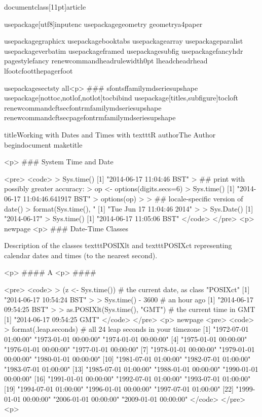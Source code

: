 documentclass[11pt]{article} %

usepackage[utf8]{inputenc} 
usepackage{geometry} %
geometry{a4paper} 

usepackage{graphicx} 
usepackage{booktabs} %
usepackage{array} %
usepackage{paralist} %
usepackage{verbatim} 
usepackage{framed}
usepackage{subfig}
usepackage{fancyhdr} %
pagestyle{fancy} %
renewcommand{headrulewidth}{0pt} 
lhead{}chead{}rhead{}
lfoot{}cfoot{thepage}rfoot{}

usepackage{sectsty}
all<p>
### sfont{sffamilymdseriesupshape} 
usepackage[nottoc,notlof,notlot]{tocbibind} %
usepackage[titles,subfigure]{tocloft} %
renewcommand{cftsecfont}{rmfamilymdseriesupshape}
renewcommand{cftsecpagefont}{rmfamilymdseriesupshape}

title{Working with Dates and Times with texttt{R}}
author{The Author}
begin{document}
maketitle


<p>
### {System Time and Date}

<pre>
<code>
> Sys.time()
[1] "2014-06-17 11:04:46 BST"
> ## print with possibly greater accuracy:
> op <- options(digits.secs=6)
> Sys.time()
[1] "2014-06-17 11:04:46.641917 BST"
> options(op)
> 
> ## locale-specific version of date()
> format(Sys.time(), "%
[1] "Tue Jun 17 11:04:46 2014"
> 
> Sys.Date()
[1] "2014-06-17"
> Sys.time()
[1] "2014-06-17 11:05:06 BST"
</code>
</pre>
<p>
newpage
<p>
### {Date-Time Classes}


Description of the classes texttt{POSIXlt} and texttt{POSIXct} representing calendar dates and times (to the nearest second).

<p>
#### {A <p>
#### }

<pre>
<code>
> (z <- Sys.time())             # the current date, as class "POSIXct"
[1] "2014-06-17 10:54:24 BST"
> 
> Sys.time() - 3600             # an hour ago
[1] "2014-06-17 09:54:25 BST"
> 
> as.POSIXlt(Sys.time(), "GMT") # the current time in GMT
[1] "2014-06-17 09:54:25 GMT"
</code>
</pre>
<p>
newpage
<pre>
<code>
> format(.leap.seconds)         # all 24 leap seconds in your timezone
 [1] "1972-07-01 01:00:00" "1973-01-01 00:00:00" "1974-01-01 00:00:00"
 [4] "1975-01-01 00:00:00" "1976-01-01 00:00:00" "1977-01-01 00:00:00"
 [7] "1978-01-01 00:00:00" "1979-01-01 00:00:00" "1980-01-01 00:00:00"
[10] "1981-07-01 01:00:00" "1982-07-01 01:00:00" "1983-07-01 01:00:00"
[13] "1985-07-01 01:00:00" "1988-01-01 00:00:00" "1990-01-01 00:00:00"
[16] "1991-01-01 00:00:00" "1992-07-01 01:00:00" "1993-07-01 01:00:00"
[19] "1994-07-01 01:00:00" "1996-01-01 00:00:00" "1997-07-01 01:00:00"
[22] "1999-01-01 00:00:00" "2006-01-01 00:00:00" "2009-01-01 00:00:00"
</code>
</pre>
<p>

